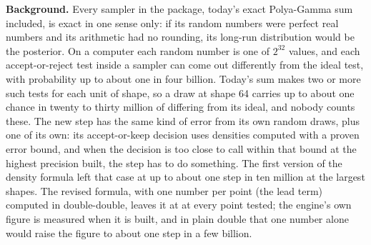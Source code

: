 \textbf{Background.} Every sampler in the package, today's exact Polya-Gamma sum included, is exact in one sense
only: if its random numbers were perfect real numbers and its arithmetic had no rounding, its long-run
distribution would be the posterior. On a computer each random number is one of $2^{32}$ values, and each
accept-or-reject test inside a sampler can come out differently from the ideal test, with probability up to about
one in four billion. Today's sum makes two or more such tests for each unit of shape, so a draw at shape 64
carries up to about one chance in twenty to thirty million of differing from its ideal, and nobody counts these. The new step has
the same kind of error from its own random draws, plus one of its own: its accept-or-keep decision uses densities
computed with a proven error bound, and when the decision is too close to call within that bound at the highest
precision built, the step has to do something. The first version of the density formula left that case at up to
about one step in ten million at the largest shapes. The revised formula, with one number per point (the lead
term) computed in double-double, leaves it at \FLOORSTEPWORDS{} at every point tested; the engine's own figure
is measured when it is built, and in plain double that one number alone would raise the figure to about one step
in a few billion.


